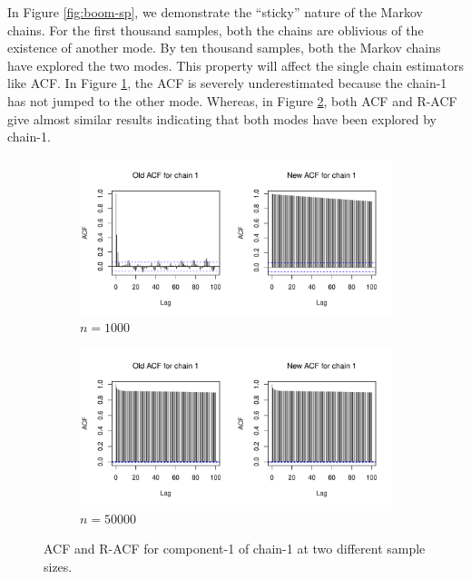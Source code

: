\documentclass[11pt]{article}
\theoremstyle{remark}
\begin{document}
In Figure \ref{fig:boom-sp}, we demonstrate the ``sticky'' nature of the Markov chains. For the first thousand samples, both the chains are oblivious of the existence of another mode. By ten thousand samples, both the Markov chains have explored the two modes. This property will affect the single chain estimators like ACF. In Figure \ref{subfig:boom-acf_1e3}, the ACF is severely underestimated because the chain-1 has not jumped to the other mode. Whereas, in Figure \ref{subfig:boom-acf_1e4}, both ACF and R-ACF give almost similar results indicating that both modes have been explored by chain-1. 

\begin{figure}[h]
    \centering
    \begin{subfigure}[h]{.7\textwidth}
      \centering
      \includegraphics[width = \textwidth]{plots/boom-acf,n=1000.pdf}
      \caption{$n = 1000$}
      \label{subfig:boom-acf_1e3}
    \end{subfigure}
    \begin{subfigure}[h]{.7\textwidth}
      \centering
      \includegraphics[width = \textwidth]{plots/boom-acf,n=50000.pdf}
      \caption{$n = 50000$}
      \label{subfig:boom-acf_1e4}
    \end{subfigure}
    \caption{ACF and R-ACF for component-1 of chain-1 at two different sample sizes. }
    \label{fig:boom-acf}
\end{figure}
\end{document}
